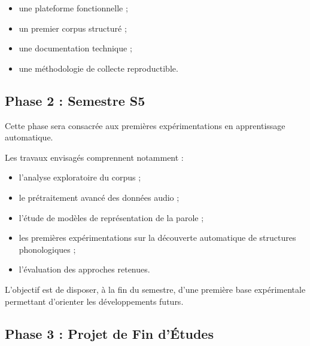 \begin{itemize}

\item une plateforme fonctionnelle ;

\item un premier corpus structuré ;

\item une documentation technique ;

\item une méthodologie de collecte reproductible.

\end{itemize}


\subsection{Phase 2 : Semestre S5}

Cette phase sera consacrée aux premières expérimentations en
apprentissage automatique.

Les travaux envisagés comprennent notamment :

\begin{itemize}

\item l'analyse exploratoire du corpus ;

\item le prétraitement avancé des données audio ;

\item l'étude de modèles de représentation de la parole ;

\item les premières expérimentations sur la découverte automatique de
structures phonologiques ;

\item l'évaluation des approches retenues.

\end{itemize}

L'objectif est de disposer, à la fin du semestre, d'une première base
expérimentale permettant d'orienter les développements futurs.


\subsection{Phase 3 : Projet de Fin d'Études}

